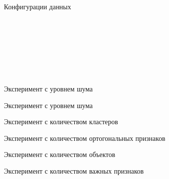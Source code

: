 \documentclass[10pt,pdf,hyperref={unicode}]{beamer}
\begin{document}
\begin{frame}{Конфигурации данных}
\begin{figure}[H]
	\begin{minipage}[h]{0.47\linewidth}
		  \\
	\end{minipage}
	\hfill
	\begin{minipage}[h]{0.47\linewidth}
		 \\
	\end{minipage}
	\vfill
	\begin{minipage}[h]{0.47\linewidth}
		  \\
	\end{minipage}
	\hfill
	\begin{minipage}[h]{0.47\linewidth}
		 \\
	\end{minipage}
	
\end{figure}

\end{frame}




\begin{frame}{Эксперимент с уровнем шума}


			

\end{frame}

\begin{frame}{Эксперимент с уровнем шума}




\end{frame}

\begin{frame}{Эксперимент с количеством кластеров}




\end{frame}

\begin{frame}{Эксперимент с количеством ортогональных признаков}




\end{frame}
\begin{frame}{Эксперимент с количеством объектов}




\end{frame}

\begin{frame}{Эксперимент с количеством важных признаков}




\end{frame}

\end{document}
